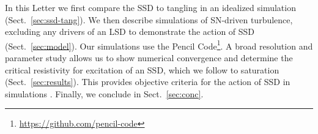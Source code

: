 \documentclass[preprint2]{aastex63}
\newcommand{\fg}[1]{\textcolor{midgreen}{#1}}
\newcommand{\mm}[1]{\textcolor{mypurple}{#1}}
\begin{document}
In this {\mm L}etter we \mm{first} compare the SSD to tangling in an idealized simulation
(Sect.~\ref{sec:ssd-tang})\fg{.
We} \mm{then describe} \fg{simulations of SN-driven turbulence,
excluding any drivers of an LSD to} \mm{demonstrate the action} \fg{of SSD  (Sect.~\ref{sec:model}).} 
Our \mm{simulations} use the {\sc Pencil Code}\footnote{
\href{https://github.com/pencil-code}{https://github.com/pencil-code}}.
A broad resolution and parameter study allows us to \mm{show numerical} \fg{convergence
and} \mm{determine} the critical
resistivity for excitation of an SSD, \fg{which we follow} to 
saturation (Sect.~\ref{sec:results}).
This provides objective criteria
\mm{for the action}
of SSD in simulations \citep[such as][]{Gent:2013b,GE20,SBADMN19}.
Finally, we conclude in Sect.~\ref{sec:conc}.
\end{document}
